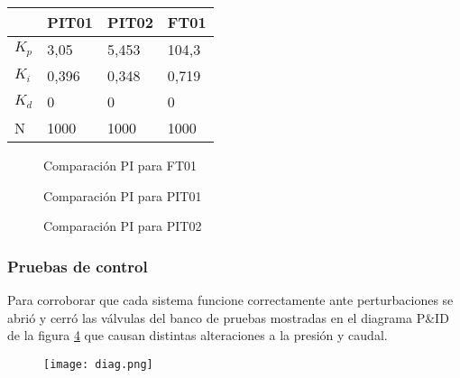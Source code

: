 {\begin{table}[h]
	\centering
	\begin{tabular}{|l|l|l|l|}
		\hline
		& PIT01 & PIT02 & FT01 \\ \hline
		$K_p$ & 3,05 & 5,453 & 104,3 \\ \hline
		$K_i$ & 0,396 & 0,348 & 0,719 \\ \hline
		$K_d$ & 0 & 0 & 0 \\ \hline
		N & 1000 & 1000 & 1000 \\ \hline
	\end{tabular}
	\label{tab:pid}
\end{table}

\begin{comment}
	C:\Users\glori\Desktop\DANIELA\VISUAL_DANI\Automa\MATLAB\22-05\Comparacion PID y PLANTAS\FT01
	Respuesta_Strenj
\end{comment}






\begin{figure}[h!]
	\centering
\hspace{-4mm}
	\caption{Comparación PI para FT01} \label{fig:FT1}
\end{figure}

\begin{figure}[h!]
	\centering
\hspace{-4mm}
	\caption{Comparación PI para PIT01} \label{fig:PIT1}
\end{figure}

\begin{figure}[h!]
	\centering
	\hspace{-4mm}
	\caption{Comparación PI para PIT02} \label{fig:PIT2}
\end{figure}

\clearpage
\subsubsection{Pruebas de control}

Para corroborar que cada sistema funcione correctamente ante perturbaciones se abrió y cerró las válvulas del banco de pruebas mostradas en el diagrama P\&ID de la figura \ref{fig:diag2} que causan distintas alteraciones a la presión y caudal.
\begin{figure}[htb]
	\centering
	\texttt{[image: diag.png]}
	\label{fig:diag2}
\end{figure}

}
